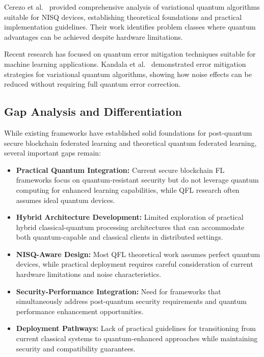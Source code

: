 \documentclass[10pt,journal,compsoc]{IEEEtran}
\begin{document}
Cerezo et al.~\cite{Cerezo2021} provided comprehensive analysis of variational quantum algorithms suitable for NISQ devices, establishing theoretical foundations and practical implementation guidelines. Their work identifies problem classes where quantum advantages can be achieved despite hardware limitations.

Recent research has focused on quantum error mitigation techniques suitable for machine learning applications. Kandala et al.~\cite{Kandala2024} demonstrated error mitigation strategies for variational quantum algorithms, showing how noise effects can be reduced without requiring full quantum error correction.

\subsection{Gap Analysis and Differentiation}

While existing frameworks have established solid foundations for post-quantum secure blockchain federated learning and theoretical quantum federated learning, several important gaps remain:

\begin{itemize}
\item \textbf{Practical Quantum Integration:} Current secure blockchain FL frameworks focus on quantum-resistant security but do not leverage quantum computing for enhanced learning capabilities, while QFL research often assumes ideal quantum devices.

\item \textbf{Hybrid Architecture Development:} Limited exploration of practical hybrid classical-quantum processing architectures that can accommodate both quantum-capable and classical clients in distributed settings.

\item \textbf{NISQ-Aware Design:} Most QFL theoretical work assumes perfect quantum devices, while practical deployment requires careful consideration of current hardware limitations and noise characteristics.

\item \textbf{Security-Performance Integration:} Need for frameworks that simultaneously address post-quantum security requirements and quantum performance enhancement opportunities.

\item \textbf{Deployment Pathways:} Lack of practical guidelines for transitioning from current classical systems to quantum-enhanced approaches while maintaining security and compatibility guarantees.
\end{itemize}
\end{document}
